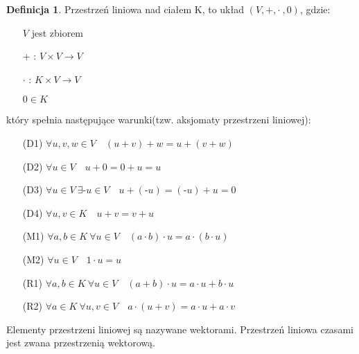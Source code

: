 \documentclass[12pt,a4paper]{article}
\theoremstyle{plain}
\theoremstyle{definition}
\theoremstyle{definition}
\newtheorem{df}{Definicja}[section]
\theoremstyle{definition}
\theoremstyle{definition}
\theoremstyle{definition}
\theoremstyle{definition}
\theoremstyle{definition}
\theoremstyle{definition}
\begin{document}
\begin{df}
Przestrzeń liniowa nad ciałem K, to układ $(V,+,\cdot\ ,0)$, gdzie:
\begin{itemize} 
        \item[] $V$ jest zbiorem
        \item[+]: $V \times V \rightarrow V$
        \item[$\cdot$]: $K \times V \rightarrow V$
        \item[] $0 \in K$ 
    \end{itemize} 
    który spełnia następujące warunki(tzw. aksjomaty przestrzeni liniowej): 
    \begin{itemize}
        \item[(D1)] $\forall u, v, w \in V \quad (u+v)+w = u + (v+w)$
        \item[(D2)] $\forall u \in V \quad u+0 = 0+u = u$
        \item[(D3)] $\forall u \in V \ \exists \text{-}u \in V \quad u + (\text{-}u) = (\text{-}u) + u = 0$
        \item[(D4)] $\forall u, v \in K \quad u+v = v+u$
        \item[(M1)] $\forall a, b \in K\  \forall u \in V \quad (a\cdot b)\cdot u = a\cdot (b\cdot u) $
        \item[(M2)] $\forall u \in V \quad 1\cdot u = u$
        \item[(R1)] $ \forall a,b \in K\ \forall u \in V \quad (a+b)\cdot u = a\cdot u + b\cdot u $
        \item[(R2)] $ \forall a \in K\ \forall u,v \in V \quad a\cdot (u+v) = a\cdot u + a\cdot v $
    \end{itemize}
    \vspace{5mm}
    Elementy przestrzeni liniowej są nazywane wektorami. 
    Przestrzeń liniowa czasami jest zwana przestrzenią wektorową.
\end{df}
\end{document}
